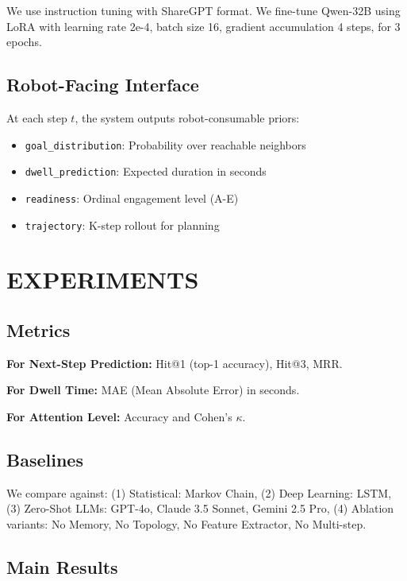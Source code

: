 \documentclass[letterpaper]{article}
\begin{document}
We use instruction tuning with ShareGPT format. We fine-tune Qwen-32B using LoRA with learning rate 2e-4, batch size 16, gradient accumulation 4 steps, for 3 epochs.

\subsection{Robot-Facing Interface}

At each step $t$, the system outputs robot-consumable priors:
\begin{itemize}
    \item \texttt{goal\_distribution}: Probability over reachable neighbors
    \item \texttt{dwell\_prediction}: Expected duration in seconds
    \item \texttt{readiness}: Ordinal engagement level (A-E)
    \item \texttt{trajectory}: K-step rollout for planning
\end{itemize}

\section{EXPERIMENTS}

\subsection{Metrics}

\textbf{For Next-Step Prediction:} Hit@1 (top-1 accuracy), Hit@3, MRR.

\textbf{For Dwell Time:} MAE (Mean Absolute Error) in seconds.

\textbf{For Attention Level:} Accuracy and Cohen's $\kappa$.

\subsection{Baselines}

We compare against: (1) Statistical: Markov Chain, (2) Deep Learning: LSTM, (3) Zero-Shot LLMs: GPT-4o, Claude 3.5 Sonnet, Gemini 2.5 Pro, (4) Ablation variants: No Memory, No Topology, No Feature Extractor, No Multi-step.

\subsection{Main Results}
\end{document}
